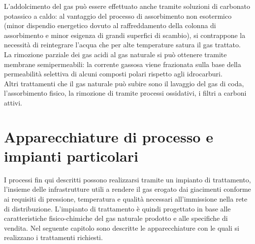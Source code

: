 L'addolcimento del gas può essere effettuato anche tramite soluzioni di carbonato potassico a caldo: al vantaggio del processo di assorbimento non esotermico (minor dispendio energetico dovuto al raffreddamento della colonna di assorbimento e minor esigenza di grandi superfici di scambio), si contrappone la necessità di reintegrare l'acqua che per alte temperature satura il gas trattato.\\
La rimozione parziale dei gas acidi al gas naturale si può ottenere tramite membrane semipermeabili: la corrente gassosa viene frazionata sulla base della permeabilità selettiva di alcuni composti polari rispetto agli idrocarburi.\\
Altri trattamenti che il gas naturale può subire sono il lavaggio del gas di coda, l'assorbimento fisico, la rimozione di  tramite processi ossidativi, i filtri a carboni attivi.

\section{Apparecchiature di processo e impianti particolari}
I processi fin qui descritti possono realizzarsi tramite un impianto di trattamento, l'insieme delle infrastrutture utili a rendere il gas erogato dai giacimenti conforme ai requisiti di pressione, temperatura e qualità necessari all'immissione nella rete di distribuzione. L'impianto di trattamento è quindi progettato in base alle caratteristiche fisico-chimiche del gas naturale prodotto e alle specifiche di vendita. Nel seguente capitolo sono descritte le apparecchiature con le quali si realizzano i trattamenti richiesti.

